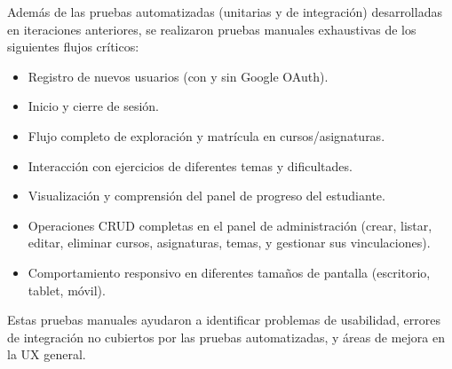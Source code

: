 Además de las pruebas automatizadas (unitarias y de integración) desarrolladas en iteraciones anteriores, se realizaron pruebas manuales exhaustivas de los siguientes flujos críticos:
\begin{itemize}
    \item Registro de nuevos usuarios (con y sin Google OAuth).
    \item Inicio y cierre de sesión.
    \item Flujo completo de exploración y matrícula en cursos/asignaturas.
    \item Interacción con ejercicios de diferentes temas y dificultades.
    \item Visualización y comprensión del panel de progreso del estudiante.
    \item Operaciones CRUD completas en el panel de administración (crear, listar, editar, eliminar cursos, asignaturas, temas, y gestionar sus vinculaciones).
    \item Comportamiento responsivo en diferentes tamaños de pantalla (escritorio, tablet, móvil).
\end{itemize}
Estas pruebas manuales ayudaron a identificar problemas de usabilidad, errores de integración no cubiertos por las pruebas automatizadas, y áreas de mejora en la UX general.
